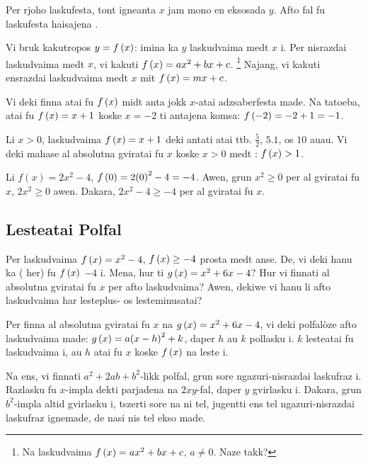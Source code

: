Per rjoho laskufesta, tont igneanta \(x\) jam mono en eksosada \(y\).
Afto fal fu laskufesta haisajena .

Vi bruk kakutropos \(y = f\left(x\right)\): imina ka \(y\) laskudvaima medt \(x\) i.
Per nisrazdai laskudvaima medt \(x\), vi kakuti
\(f \left(x\right) = ax^2 + bx + c\). \footnote{Na  laskudvaima
	\(f \left(x\right) = ax^2 + bx + c\), \(a \neq 0\). Naze takk?}
Najang, vi kakuti ensrazdai laskudvaima medt \(x\) mit \(f \left(x\right) = mx + c\).

Vi deki finna atai fu \(f \left(x\right)\) midt anta jokk \(x\)-atai adzsaberfesta made.
Na tatoeba, atai fu \(f \left(x\right) = x + 1\) koske \(x = -2\) ti antajena komsa: \(f \left(-2\right) = -2 + 1 = -1\).

Li \(x > 0\), laskudvaima \(f \left(x\right) = x + 1\) deki antati atai ttb. \(\frac{5}{2}\), \(5.1\), os \(10\) auau.
Vi deki mahase al absolutna gviratai fu \(x\) koske \(x > 0\) medt : \(f \left(x\right) > 1\).

\begin{example}
	Li \(f\left(x\right) = 2x^2 - 4\), \(f\left(0\right) = 2{\left(0\right)}^2 - 4 = -4\). Awen, grun
	\(x^2 \geq 0\) per al gviratai fu \(x\), \(2x^2 \geq 0\) awen. Dakara,
	\(2x^2 - 4 \geq -4\) per al gviratai fu \(x\).
\end{example}

\subsection{Lesteatai Polfal}

Per laskudvaima \(f \left(x\right) = x^2 - 4\), \(f\left(x\right) \geq - 4\) prosta medt anse. De, vi deki hanu
ka  ( her) fu \(f\left(x\right)\) \(-4\) i. Mena, hur ti
\(g \left(x\right) = x^2+6x-4\)? Hur vi finnati al absolutna gviratai fu \(x\) per afto laskudvaima?
Awen, dekiwe vi hanu li afto laskudvaima har lesteplus- os lesteminusatai?

Per finna al absolutna gviratai fu \(x\) na \(g \left(x\right)=x^2+6x-4\), vi deki polfalòze afto
laskudvaima  made: \(g \left(x\right) = a{\left(x-h\right)}^2+k\), daper
\(h\) au \(k\) pollasku i. \(k\) lesteatai fu laskudvaima i, au \(h\) atai fu \(x\) koske \(f \left(x\right)\)
na leste i.

Na ens, vi finnati \(a^2 + 2ab + b^2\)-likk polfal, grun sore ngazuri-nisrazdai laskufraz i.
Razlasku fu \(x\)-impla dekti parjadena na \(2xy\)-fal, daper \(y\) gvirlasku i.
Dakara, grun \(b^2\)-impla altid gvirlasku i, tszerti sore na ni tel, jugentti ens tel ngazuri-nisrazdai
laskufraz ignemade, de nasi nis tel ekso made.

